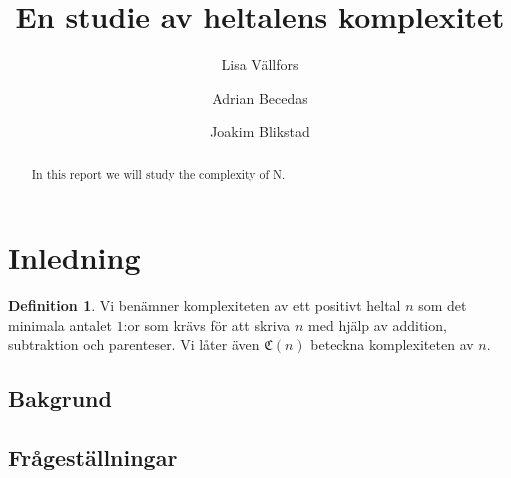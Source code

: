 \documentclass[a4paper,titlepage]{article}
\title{En studie av heltalens komplexitet}
\author{Lisa Vällfors \and Adrian Becedas \and Joakim Blikstad}
\newcommand{\C}[1]{\mathfrak C \left( #1 \right)}
\theoremstyle{definition}
\newtheorem{definition}{Definition}
\begin{document}
\maketitle

\begin{abstract}
    In this report we will study the complexity of N.
\end{abstract}

\tableofcontents 
\newpage

\section{Inledning}

    \begin{definition}
       Vi benämner komplexiteten av ett positivt heltal $n$ som det minimala
       antalet $1$:or som krävs för att skriva $n$ med hjälp av addition,
       subtraktion och parenteser. Vi låter även $\C{n}$ beteckna komplexiteten av
       $n$. 
    \end{definition}

    \subsection{Bakgrund}

    \subsection{Frågeställningar}
        
\end{document}
